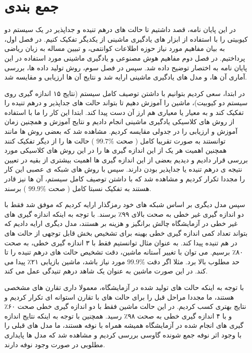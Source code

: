 \section{جمع بندی}
در این پایان نامه، قصد داشتیم تا حالت های درهم تنیده و جداپذیر در یک سیستم دو کیوبیتی را با استفاده از ابزار های یادگیری ماشینی از یکدیگر تفکیک کنیم. در فصل اول، به بیان مفاهیم مورد نیاز حوزه اطلاعات کوانتمی، و تبیین مساله به زبان ریاضی پرداختیم. در فصل دوم مفاهیم هوش مصنوعی و یادگیری ماشینی مورد استفاده در این پایان نامه به اختصار توضیح داده شد. سپس در فصل سوم، روش تولید داده ها، بررسی آماری آن ها، و مدل های یادگیری ماشینی ارایه شد و نتایج آن ها ارزیابی و مقایسه شد.


در ابتدا، سعی کردیم بتوانیم با داشتن توصیف کامل سیستم (نتایج ۱۵ اندازه گیری روی سیستم دو کیوبیت)، ماشین را آموزش دهیم تا بتواند حالت های جداپذیر و درهم تنیده را تفکیک کند و به معیار
یا معیاری هم ارز آن دست پیدا کند.
ابتدا این کار را ما با استفاده از روش های کلاسیکی یادگیری ماشینی انجام دادیم و نتایج آموزش و همچنین زمان آموزش و ارزیابی را در جدولی مقایسه کردیم. مشاهده شد که بعضی روش ها مانند
توانستند به صورت تقریبا کامل
(
صحت
$99.7\%$
)
حالت ها را از دیگر تفکیک کنند
همچنین اهمیت هر یک از این اندازه گیری ها را در این روش های کلاسیکی مورد بررسی قرار دادیم و دیدیم بعضی از این اندازه گیری ها اهمیت بیشتری از بقیه در تعیین نتیجه ی درهم تنیده یا جداپذیر بودن دارند.
سپس با روش های شبکه ی عصبی این کار را مجددا تکرار کردیم و مشاهده شد که با داشتن توصیف کامل سیستم، آن ها نیز قادر هستند به تفکیک نسبتا کامل
(
صحت
$99.9\%$
)
برسند.


سپس مدل دیگری بر اساس شبکه های خود رمزگذار ارایه کردیم که موفق شد فقط با دو اندازه گیری غیر خطی به صحت
بالای
۹۹٪
برسند. با توجه به اینکه اندازه گیری های غیر خطی در آزمایشگاه چالش برانگیز و هزینه بر هستند، مدل دیگری ارایه دادیم که بتواند تعداد کمی اندازه گیری خطی بهینه برای تشخیص بخش قابل توجهی از حالت های در هم تنیده پیدا کند. به عنوان مثال توانستیم فقط با ۳ اندازه گیری خطی، به صحت
۸۰٪
برسیم. می توان با تغییر آستانه ماشین، دقت تشخیص حالت های درهم تنیده را تا حد مطلوب بالا برد. مثلا اگر دقت
$99.9\%$
مورد نیاز باشد، ماشین بازیابی
۲۱٪
پیدا می کند. در این صورت ماشین به عنوان یک شاهد درهم تنیدگی عمل می کند.

با توجه به اینکه حالت های تولید شده در آزمایشگاه، معمولا داری تقارن های مشخصی هستند، ما مجددا مراحل قبل را برای حالت های با تقارن استوانه ای تکرار کردیم و نتایج بهتری کسب کردیم. در این حالت ماشین فقط با دو اندازه گیری خطی صحت
۶۰٪
و با ۴ اندازه گیری خطی
به صحت
۹۸٪
رسید. همچنین با توجه به اینکه نتایج اندازه گیری های انجام شده در آزمایشگاه همیشه همراه با نوفه هستند، ما مدل های قبلی را با وجود اثر نوفه جمع شونده گاوسی بررسی کردیم و مشاهده شد که مدل ها پایداری مطلوبی در صورت وجود نوفه دارند.

